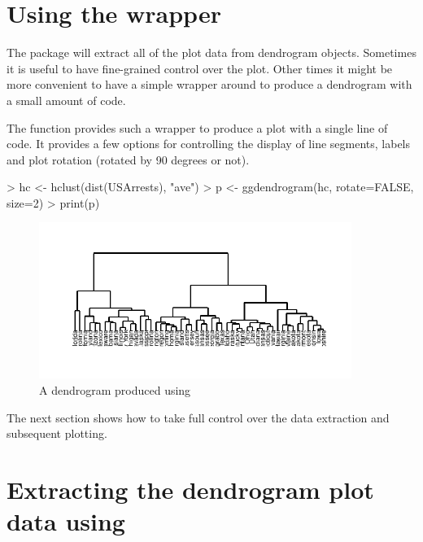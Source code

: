 \documentclass[10pt,oneside]{article}
\begin{document}
\section{Using the  wrapper}

The \ggdendro{} package will extract all of the plot data from dendrogram objects.  Sometimes it is useful to have fine-grained control over the plot.  Other times it might be more convenient to have a simple wrapper around  to produce a dendrogram with a small amount of code.

The function  provides such a wrapper to produce a plot with a single line of code.  It provides a few options for controlling the display of line segments, labels and plot rotation (rotated by 90 degrees or not).  

\begin{Schunk}
\begin{Sinput}
> hc <- hclust(dist(USArrests), "ave")
> p <- ggdendrogram(hc, rotate=FALSE, size=2)
> print(p)
\end{Sinput}
\end{Schunk}

\begin{figure}[h]
\begin{center}
\includegraphics[width=4in, height=2in]{ggdendro-dendrogram}
\end{center}
\caption{A dendrogram produced using }
\end{figure}

The next section shows how to take full control over the data extraction and subsequent plotting.

\section{Extracting the dendrogram plot data using \dendrodata{}}
\end{document}
